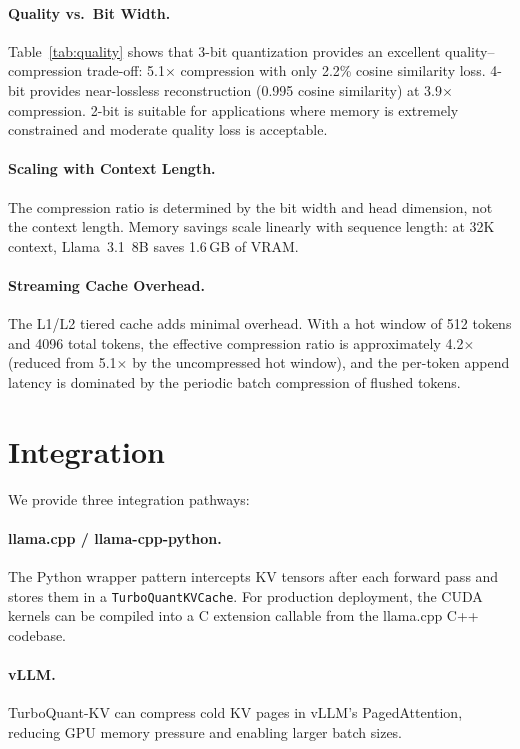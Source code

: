 \documentclass{article}
\begin{document}
\paragraph{Quality vs.\ Bit Width.}
Table~\ref{tab:quality} shows that 3-bit quantization provides an
excellent quality--compression trade-off: 5.1$\times$ compression with
only 2.2\% cosine similarity loss.  4-bit provides near-lossless
reconstruction (0.995 cosine similarity) at 3.9$\times$ compression.
2-bit is suitable for applications where memory is extremely constrained
and moderate quality loss is acceptable.

\paragraph{Scaling with Context Length.}
The compression ratio is determined by the bit width and head dimension,
not the context length.  Memory savings scale linearly with sequence
length: at 32K context, Llama~3.1~8B saves 1.6\,GB of VRAM.

\paragraph{Streaming Cache Overhead.}
The L1/L2 tiered cache adds minimal overhead.  With a hot window of 512
tokens and 4096 total tokens, the effective compression ratio is
approximately 4.2$\times$ (reduced from 5.1$\times$ by the uncompressed
hot window), and the per-token append latency is dominated by the
periodic batch compression of flushed tokens.

\section{Integration}
\label{sec:integration}

We provide three integration pathways:

\paragraph{llama.cpp / llama-cpp-python.}
The Python wrapper pattern intercepts KV tensors after each forward pass
and stores them in a \texttt{TurboQuantKVCache}.  For production
deployment, the CUDA kernels can be compiled into a C extension callable
from the llama.cpp C++ codebase.

\paragraph{vLLM.}
TurboQuant-KV can compress cold KV pages in vLLM's PagedAttention,
reducing GPU memory pressure and enabling larger batch sizes.
\end{document}
